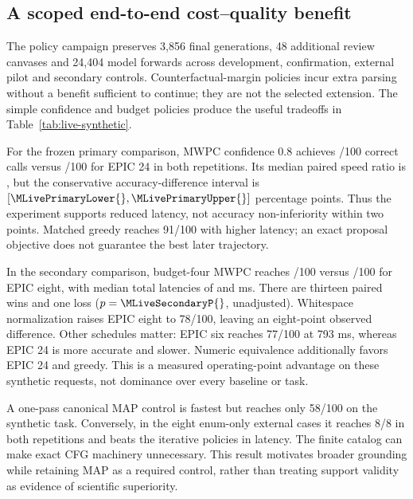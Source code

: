 \subsection{A scoped end-to-end cost--quality benefit}

The policy campaign preserves 3,856 final generations, 48 additional review canvases and 24,404 model forwards across development, confirmation, external pilot and secondary controls. Counterfactual-margin policies incur extra parsing without a benefit sufficient to continue; they are not the selected extension. The simple confidence and budget policies produce the useful tradeoffs in Table~\ref{tab:live-synthetic}.



For the frozen primary comparison, MWPC confidence 0.8 achieves \MLiveConfidenceCorrect{}/100 correct calls versus \MLiveEpicFullCorrect{}/100 for EPIC 24 in both repetitions. Its median paired speed ratio is \MLivePrimarySpeed{}, but the conservative accuracy-difference interval is $[\MLivePrimaryLower{},\MLivePrimaryUpper{}]$ percentage points. Thus the experiment supports reduced latency, not accuracy non-inferiority within two points. Matched greedy reaches 91/100 with higher latency; an exact proposal objective does not guarantee the best later trajectory.

In the secondary comparison, budget-four MWPC reaches \MLiveBudgetFourCorrect{}/100 versus \MLiveEpicEightCorrect{}/100 for EPIC eight, with median total latencies of \MLiveBudgetFourMs{} and \MLiveEpicEightMs{} ms. There are thirteen paired wins and one loss ($p=\MLiveSecondaryP{}$, unadjusted). Whitespace normalization raises EPIC eight to 78/100, leaving an eight-point observed difference. Other schedules matter: EPIC six reaches 77/100 at 793 ms, whereas EPIC 24 is more accurate and slower. Numeric equivalence additionally favors EPIC 24 and greedy. This is a measured operating-point advantage on these synthetic requests, not dominance over every baseline or task.

A one-pass canonical MAP control is fastest but reaches only 58/100 on the synthetic task. Conversely, in the eight enum-only external cases it reaches 8/8 in both repetitions and beats the iterative policies in latency. The finite catalog can make exact CFG machinery unnecessary. This result motivates broader grounding while retaining MAP as a required control, rather than treating support validity as evidence of scientific superiority.

